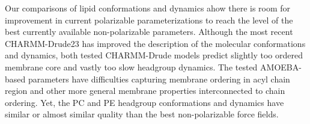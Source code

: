 \documentclass[journal=jctcce,manuscript=article,layout=singlecolumn]{achemso}
\begin{document}
Our comparisons of lipid conformations and dynamics ahow there is room for improvement in current polarizable parameterizations to reach the level of the best currently available non-polarizable parameters. Although the most recent CHARMM-Drude23 has improved the description of the molecular conformations and dynamics, both tested CHARMM-Drude models predict slightly too ordered membrane core and vastly too slow headgroup dynamics.
%
The tested AMOEBA-based parameters have difficulties capturing membrane ordering in acyl chain region and other more general membrane properties interconnected to chain ordering.  %
Yet, the PC and PE headgroup conformations and dynamics have similar or almost similar quality 
than the best non-polarizable force fields. 
\end{document}
